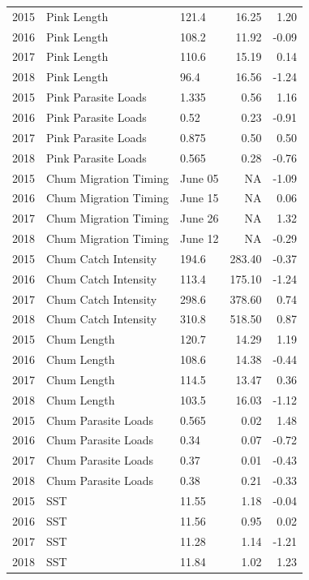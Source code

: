 \documentclass[fleqn,10pt]{wlpeerj} %
\begin{document}
\begin{longtable}[]{@{}rllrr@{}}
2015 & Pink Length & 121.4 & 16.25 & 1.20\tabularnewline
2016 & Pink Length & 108.2 & 11.92 & -0.09\tabularnewline
2017 & Pink Length & 110.6 & 15.19 & 0.14\tabularnewline
2018 & Pink Length & 96.4 & 16.56 & -1.24\tabularnewline
2015 & Pink Parasite Loads & 1.335 & 0.56 & 1.16\tabularnewline
2016 & Pink Parasite Loads & 0.52 & 0.23 & -0.91\tabularnewline
2017 & Pink Parasite Loads & 0.875 & 0.50 & 0.50\tabularnewline
2018 & Pink Parasite Loads & 0.565 & 0.28 & -0.76\tabularnewline
2015 & Chum Migration Timing & June 05 & NA & -1.09\tabularnewline
2016 & Chum Migration Timing & June 15 & NA & 0.06\tabularnewline
2017 & Chum Migration Timing & June 26 & NA & 1.32\tabularnewline
2018 & Chum Migration Timing & June 12 & NA & -0.29\tabularnewline
2015 & Chum Catch Intensity & 194.6 & 283.40 & -0.37\tabularnewline
2016 & Chum Catch Intensity & 113.4 & 175.10 & -1.24\tabularnewline
2017 & Chum Catch Intensity & 298.6 & 378.60 & 0.74\tabularnewline
2018 & Chum Catch Intensity & 310.8 & 518.50 & 0.87\tabularnewline
2015 & Chum Length & 120.7 & 14.29 & 1.19\tabularnewline
2016 & Chum Length & 108.6 & 14.38 & -0.44\tabularnewline
2017 & Chum Length & 114.5 & 13.47 & 0.36\tabularnewline
2018 & Chum Length & 103.5 & 16.03 & -1.12\tabularnewline
2015 & Chum Parasite Loads & 0.565 & 0.02 & 1.48\tabularnewline
2016 & Chum Parasite Loads & 0.34 & 0.07 & -0.72\tabularnewline
2017 & Chum Parasite Loads & 0.37 & 0.01 & -0.43\tabularnewline
2018 & Chum Parasite Loads & 0.38 & 0.21 & -0.33\tabularnewline
2015 & SST & 11.55 & 1.18 & -0.04\tabularnewline
2016 & SST & 11.56 & 0.95 & 0.02\tabularnewline
2017 & SST & 11.28 & 1.14 & -1.21\tabularnewline
2018 & SST & 11.84 & 1.02 & 1.23\tabularnewline
\bottomrule
\end{longtable}
\end{document}
